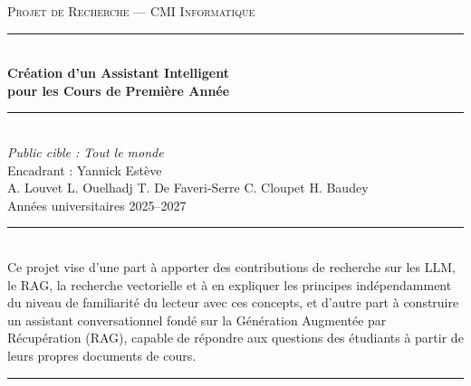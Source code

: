 \documentclass[a4paper,11pt]{article}
\begin{document}
\thispagestyle{empty}

\vspace*{3cm}

\begin{center}
    {\small\scshape Projet de Recherche --- CMI Informatique}\\[1cm]
    {\rule{\linewidth}{0.4pt}}\\[0.6cm]
    {\LARGE\bfseries Création d'un Assistant Intelligent\\[0.3cm]pour les Cours de Première Année}\\[0.6cm]
    {\rule{\linewidth}{0.4pt}}\\[1.2cm]
    {\normalsize\itshape Public cible : Tout le monde}\\[0.4cm]
    {\normalsize Encadrant : Yannick Estève}\\[2.5cm]
    {\normalsize
        A. Louvet \quad L. Ouelhadj \quad T. De Faveri-Serre \quad C. Cloupet \quad H. Baudey
    }\\[0.8cm]
    {\small Années universitaires 2025--2027}
\end{center}

\vfill

\begin{center}
\noindent\rule{0.5\linewidth}{0.4pt}\\[0.5cm]
{\small
Ce projet vise d'une part à apporter des contributions de recherche sur les
LLM, le RAG, la recherche vectorielle et à en expliquer les principes
indépendamment du niveau de familiarité du lecteur avec ces concepts,
et d'autre part à construire un assistant conversationnel fondé sur la
Génération Augmentée par Récupération (RAG), capable de répondre aux
questions des étudiants à partir de leurs propres documents de cours.
}\\[0.4cm]
\noindent\rule{0.5\linewidth}{0.4pt}
\end{center}

\vspace{2cm}


\newpage
\tableofcontents

\end{document}
